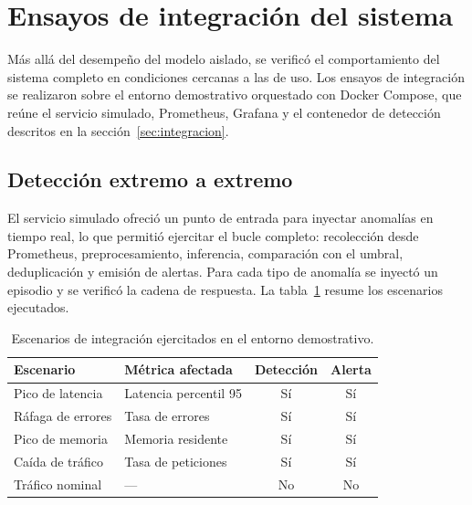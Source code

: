 
\section{Ensayos de integración del sistema}
\label{sec:ensayos-integracion}

Más allá del desempeño del modelo aislado, se verificó el comportamiento del sistema completo en condiciones cercanas a las de uso. Los ensayos de integración se realizaron sobre el entorno demostrativo orquestado con Docker Compose, que reúne el servicio simulado, Prometheus, Grafana y el contenedor de detección descritos en la sección~\ref{sec:integracion}.

\subsection{Detección extremo a extremo}

El servicio simulado ofreció un punto de entrada para inyectar anomalías en tiempo real, lo que permitió ejercitar el bucle completo: recolección desde Prometheus, preprocesamiento, inferencia, comparación con el umbral, deduplicación y emisión de alertas. Para cada tipo de anomalía se inyectó un episodio y se verificó la cadena de respuesta. La tabla~\ref{tab:integracion-escenarios} resume los escenarios ejecutados.

\begin{table}[h]
\centering
\small
\caption{Escenarios de integración ejercitados en el entorno demostrativo.}
\label{tab:integracion-escenarios}
\begin{tabular}{@{}>{\raggedright\arraybackslash}p{}>{\raggedright\arraybackslash}p{}cc@{}}
\toprule
\textbf{Escenario} & \textbf{Métrica afectada} & \textbf{Detección} & \textbf{Alerta} \\
\midrule
Pico de latencia & Latencia percentil 95 & Sí & Sí \\
Ráfaga de errores & Tasa de errores & Sí & Sí \\
Pico de memoria & Memoria residente & Sí & Sí \\
Caída de tráfico & Tasa de peticiones & Sí & Sí \\
Tráfico nominal & --- & No & No \\
\bottomrule
\end{tabular}
\end{table}

